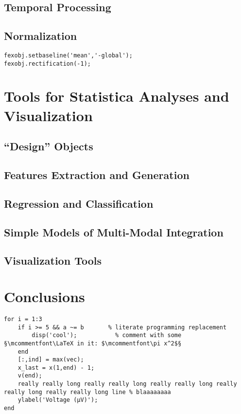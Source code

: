 \documentclass[11pt, oneside]{article}
\begin{document}
\subsection{Temporal Processing}

\subsection{Normalization}

\begin{lstlisting}
fexobj.setbaseline('mean','-global');
fexobj.rectification(-1);
\end{lstlisting}

\section{Tools for Statistica Analyses and Visualization}

\subsection{``Design'' Objects}

\subsection{Features Extraction and Generation}

\subsection{Regression and Classification}

\subsection{Simple Models of Multi-Modal Integration}

\subsection{Visualization Tools}

\section{Conclusions}

\begin{lstlisting}
for i = 1:3
	if i >= 5 && a ~= b       % literate programming replacement
		disp('cool');           % comment with some §\mcommentfont\LaTeX in it: $\mcommentfont\pi x^2$§
	end
	[:,ind] = max(vec);
	x_last = x(1,end) - 1;
	v(end);
	really really long really really long really really long really really long really really long line % blaaaaaaaa
	ylabel('Voltage (µV)');
end
\end{lstlisting}
\end{document}
